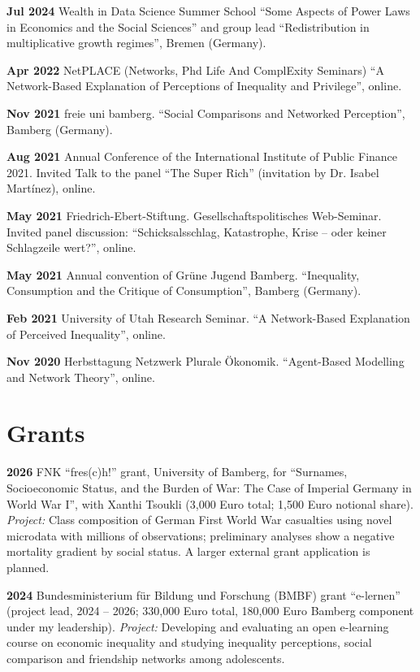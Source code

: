 \documentclass[margin]{res}
\begin{document}
\begin{resume}
	\textbf{Jul 2024} Wealth in Data Science Summer School ``Some Aspects of Power Laws in Economics and the Social Sciences'' and group lead ``Redistribution in multiplicative growth regimes'', Bremen (Germany).
	
	\textbf{Apr 2022} NetPLACE (Networks, Phd Life And ComplExity Seminars) ``A Network-Based Explanation of Perceptions of Inequality and Privilege'', online.
	
	\textbf{Nov 2021} freie uni bamberg. ``Social Comparisons and Networked Perception'', Bamberg (Germany).
	
	\textbf{Aug 2021} Annual Conference of the International Institute of Public Finance 2021. Invited Talk to the panel ``The Super Rich'' (invitation by Dr. Isabel Mart\'inez), online.
	
	\textbf{May 2021} Friedrich-Ebert-Stiftung. Gesellschaftspolitisches Web-Seminar. Invited panel discussion: ``Schicksalsschlag, Katastrophe, Krise -- oder keiner Schlagzeile wert?'', online.
	
	
	\textbf{May 2021} Annual convention of Gr\"une Jugend Bamberg. ``Inequality, Consumption and the Critique of Consumption'', Bamberg (Germany).
	
	\textbf{Feb 2021} University of Utah Research Seminar. ``A Network-Based Explanation of Perceived Inequality'', online.
	
	\textbf{Nov 2020} Herbsttagung Netzwerk Plurale \"Okonomik. ``Agent-Based Modelling and Network Theory'', online.
	
	\section{Grants}
	\textbf{2026} FNK ``fres(c)h!'' grant, University of Bamberg, for ``Surnames, Socioeconomic Status, and the Burden of War: The Case of Imperial Germany in World War I'', with Xanthi Tsoukli (3,000 Euro total; 1,500 Euro notional share). \textit{Project:} Class composition of German First World War casualties using novel microdata with millions of observations; preliminary analyses show a negative mortality gradient by social status. A larger external grant application is planned.
	
	\textbf{2024} Bundesministerium f\"ur Bildung und Forschung (BMBF) grant ``e-lernen'' (project lead, 2024 -- 2026; 330,000 Euro total, 180,000 Euro Bamberg component under my leadership). \textit{Project:} Developing and evaluating an open e-learning course on economic inequality and studying inequality perceptions, social comparison and friendship networks among adolescents.
	

\end{resume}
\end{document}
